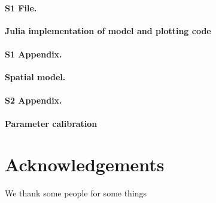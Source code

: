 \documentclass[10pt,letterpaper]{article}
\begin{document}
\paragraph*{S1 File.}
\label{S1_File}
{\bf Julia implementation of model and plotting code}  

\paragraph*{S1 Appendix.}
\label{S1_Appendix}
{\bf Spatial model.} 

\paragraph*{S2 Appendix.}
\label{S2_Appendix}
{\bf Parameter calibration} 

\section*{Acknowledgements}
We thank some people for some things

\nolinenumbers

%
% 
%




% 

\end{document}
